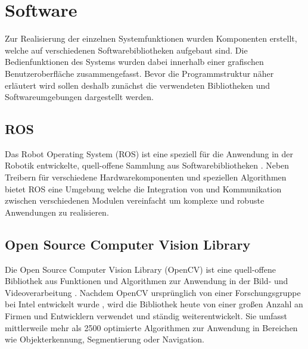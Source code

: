 
\red[Transformationen:\\
Map = World\\
World -> BaseLink -> CameraLink -> Camera\\
Camera -> Projector\\
Projector -> IntrinsicProj\\
World -> Objects\\
World -> ARMarker (eq. to Objects)\\
]

\section{Software}
Zur Realisierung der einzelnen Systemfunktionen wurden Komponenten erstellt, welche auf verschiedenen Softwarebibliotheken aufgebaut sind. Die Bedienfunktionen des Systems wurden dabei innerhalb einer grafischen Benutzeroberfläche zusammengefasst. Bevor die Programmstruktur näher erläutert wird sollen deshalb zunächst die verwendeten Bibliotheken und Softwareumgebungen dargestellt werden.

\subsection{ROS}
\label{chap:ros}
Das Robot Operating System (ROS) ist eine speziell für die Anwendung in der Robotik entwickelte, quell-offene Sammlung aus Softwarebibliotheken \cite{ROS}. Neben Treibern für verschiedene Hardwarekomponenten und speziellen Algorithmen bietet ROS eine Umgebung welche die Integration von und Kommunikation zwischen verschiedenen Modulen vereinfacht um komplexe und robuste Anwendungen zu realisieren. 

\subsection{Open Source Computer Vision Library}
Die Open Source Computer Vision Library (OpenCV) ist eine quell-offene Bibliothek aus Funktionen und Algorithmen zur Anwendung in der Bild- und Videoverarbeitung \cite{OpenCV}. Nachdem OpenCV ursprünglich von einer Forschungsgruppe bei Intel entwickelt wurde \cite{Laganiere2011}, wird die Bibliothek heute von einer großen Anzahl an Firmen und Entwicklern verwendet und ständig weiterentwickelt. Sie umfasst mittlerweile mehr als 2500 optimierte Algorithmen zur Anwendung in Bereichen wie Objekterkennung, Segmentierung oder Navigation.

